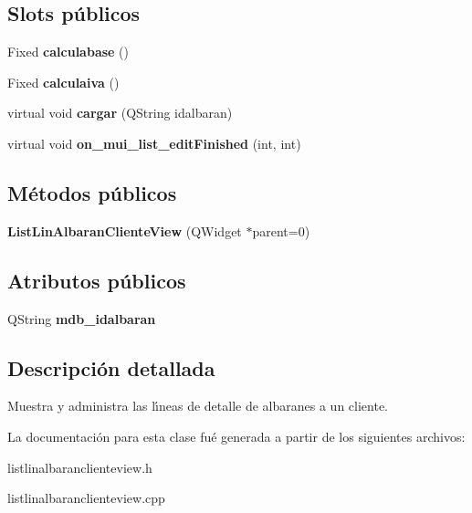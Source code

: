 \subsection*{Slots p\'{u}blicos}
\begin{CompactItemize}
\item 
Fixed {\bf calculabase} ()\label{classListLinAlbaranClienteView_i0}

\item 
Fixed {\bf calculaiva} ()\label{classListLinAlbaranClienteView_i1}

\item 
virtual void {\bf cargar} (QString idalbaran)\label{classListLinAlbaranClienteView_i2}

\item 
virtual void {\bf on\_\-mui\_\-list\_\-edit\-Finished} (int, int)\label{classListLinAlbaranClienteView_i3}

\end{CompactItemize}
\subsection*{M\'{e}todos p\'{u}blicos}
\begin{CompactItemize}
\item 
{\bf List\-Lin\-Albaran\-Cliente\-View} (QWidget $\ast$parent=0)\label{classListLinAlbaranClienteView_a0}

\end{CompactItemize}
\subsection*{Atributos p\'{u}blicos}
\begin{CompactItemize}
\item 
QString {\bf mdb\_\-idalbaran}\label{classListLinAlbaranClienteView_o0}

\end{CompactItemize}


\subsection{Descripci\'{o}n detallada}
Muestra y administra las l\'{\i}neas de detalle de albaranes a un cliente. 



La documentaci\'{o}n para esta clase fu\'{e} generada a partir de los siguientes archivos:\begin{CompactItemize}
\item 
listlinalbaranclienteview.h\item 
listlinalbaranclienteview.cpp\end{CompactItemize}
